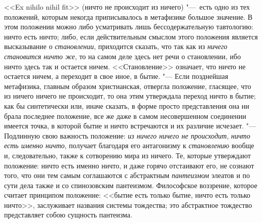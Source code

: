 <<Ex nihilo nihil fit>> (ничто не происходит из ничего) "---~есть одно из тех
положений, которым некогда приписывалось в метафизике большое значение. В
этом положении можно либо усматривать лишь бессодержательную тавтологию:
ничто есть ничто; либо, если действительным смыслом этого положения
является высказывание о {\em становлении}, приходится
сказать, что так как из {\em ничего становится}
{\em ничто же}, то на самом деле здесь нет речи о
становлении, ибо ничто здесь так и остается ничем. <<Становление>> означает,
что ничто не остается ничем, а переходит в свое иное, в бытие. "--- Если
позднейшая метафизика, главным образом христианская, отвергла положение,
гласящее, что из ничего ничего не происходит, то она этим утверждала
переход ничто в бытие; как бы синтетически или, иначе сказать, в форме
просто представления она ни брала последнее положение, все же даже в самом
несовершенном соединении имеется точка, в которой бытие и ничто встречаются
и их различие исчезает. "--- Подлинную свою важность положение:
{\em из ничего ничего не происходит},
{\em ничто есть именно ничто}, получает благодаря его
антагонизму к {\em становлению} вообще и,
следовательно, также к сотворению мира из ничего. Те, которые утверждают
положение: ничто есть именно ничто, и даже горячо отстаивают его, не
сознают того, что они тем самым соглашаются с абстрактным
{\em пантеизмом} элеатов и по сути дела также и со
спинозовским пантеизмом. Философское воззрение, которое считает принципом
положение: <<бытие есть только бытие, ничто есть только ничто>>, заслуживает
названия системы тождества; это абстрактное тождество представляет собою
сущность пантеизма.

